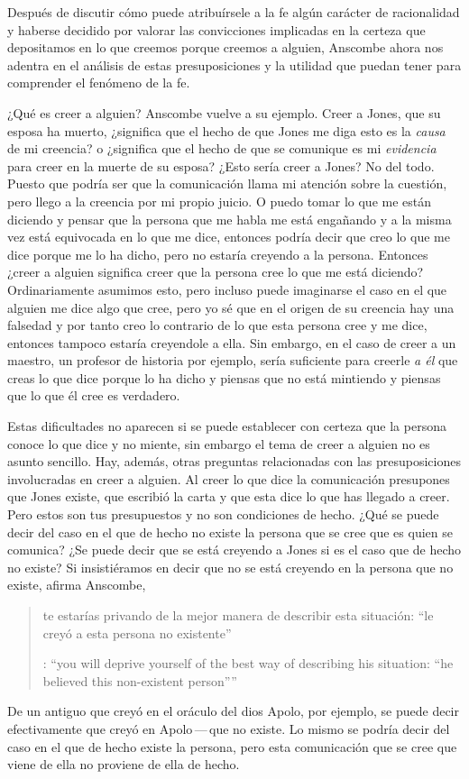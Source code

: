 Después de discutir cómo puede atribuírsele a la fe algún carácter de racionalidad y haberse decidido por valorar las convicciones implicadas en la certeza que depositamos en lo que creemos porque creemos a alguien, Anscombe ahora nos adentra en el análisis de estas presuposiciones y la utilidad que puedan tener para comprender el fenómeno de la fe.

¿Qué es creer a alguien? Anscombe vuelve a su ejemplo. Creer a Jones, que su esposa ha muerto, ¿significa que el hecho de que Jones me diga esto es la \emph{causa} de mi creencia? o ¿significa que el hecho de que se comunique es mi \emph{evidencia} para creer en la muerte de su esposa? ¿Esto sería creer a Jones? No del todo. Puesto que podría ser que la comunicación llama mi atención sobre la cuestión, pero llego a la creencia por mi propio juicio. O puedo tomar lo que me están diciendo y pensar que la persona que me habla me está engañando y a la misma vez está equivocada en lo que me dice, entonces podría decir que creo lo que me dice porque me lo ha dicho, pero no estaría creyendo a la persona. Entonces ¿creer a alguien significa creer que la persona cree lo que me está diciendo? Ordinariamente asumimos esto, pero incluso puede imaginarse el caso en el que alguien me dice algo que cree, pero yo sé que en el origen de su creencia hay una falsedad y por tanto creo lo contrario de lo que esta persona cree y me dice, entonces tampoco estaría creyendole a ella. Sin embargo, en el caso de creer a un maestro, un profesor de historia por ejemplo, sería suficiente para creerle \emph{a él} que creas lo que dice porque lo ha dicho y piensas que no está mintiendo y piensas que lo que él cree es verdadero.

Estas dificultades no aparecen si se puede establecer con certeza que la persona conoce lo que dice y no miente, sin embargo el tema de creer a alguien no es asunto sencillo. Hay, además, otras preguntas relacionadas con las presuposiciones involucradas en creer a alguien. Al creer lo que dice la comunicación presupones que Jones existe, que escribió la carta y que esta dice lo que has llegado a creer. Pero estos son tus presupuestos y no son condiciones de hecho. ¿Qué se puede decir del caso en el que de hecho no existe la persona que se cree que es quien se comunica? ¿Se puede decir que se está creyendo a Jones si es el caso que de hecho no existe? Si insistiéramos en decir que no se está creyendo en la persona que no existe, afirma Anscombe, \blockquote[{\cite[117]{anscombe1981erp:faith}}: \enquote{you will deprive yourself of the best way of describing his situation: ``he believed this non-existent person''}]{te estarías privando de la mejor manera de describir esta situación: ``le creyó a esta persona no existente''}. De un antiguo que creyó en el oráculo del dios Apolo, por ejemplo, se puede decir efectivamente que creyó en Apolo\,---\,que no existe. Lo mismo se podría decir del caso en el que de hecho existe la persona, pero esta comunicación que se cree que viene de ella no proviene de ella de hecho.

